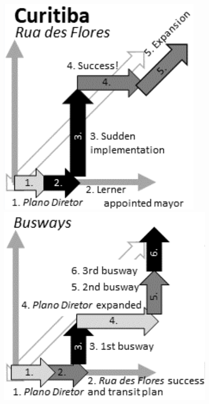 \documentclass[nobib]{tufte-handout}
\begin{document}
\begin{marginfigure}%
  \includegraphics[width=\linewidth]{Curitiba_1}
    \includegraphics[width=\linewidth]{Curitiba_2}

\end{marginfigure}
\end{document}

